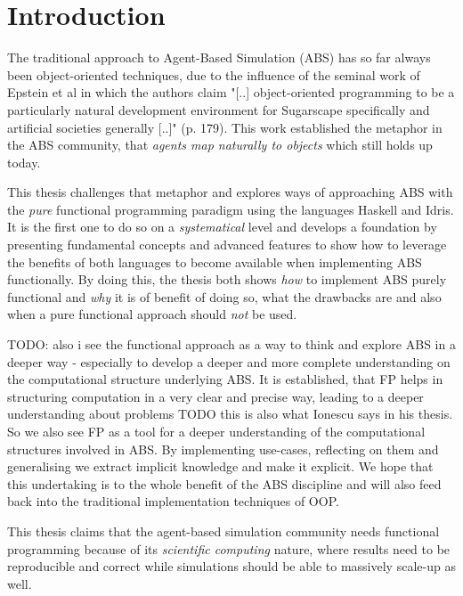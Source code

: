 \chapter{Introduction}
\label{ch:intro}

The traditional approach to Agent-Based Simulation (ABS) has so far always been object-oriented techniques, due to the influence of the seminal work of Epstein et al \cite{epstein_growing_1996} in which the authors claim "[..] object-oriented programming to be a particularly natural development environment for Sugarscape specifically and artificial societies generally [..]" (p. 179). This work established the metaphor in the ABS community, that \textit{agents map naturally to objects} \cite{north_managing_2007} which still holds up today.

This thesis challenges that metaphor and explores ways of approaching ABS with the \textit{pure} functional programming paradigm using the languages Haskell and Idris. It is the first one to do so on a \textit{systematical} level and develops a foundation by presenting fundamental concepts and advanced features to show how to leverage the benefits of both languages \cite{hudak_history_2007, brady_idris_2013} to become available when implementing ABS functionally. By doing this, the thesis both shows \textit{how} to implement ABS purely functional and \textit{why} it is of benefit of doing so, what the drawbacks are and also when a pure functional approach should \textit{not} be used. 

TODO: also i see the functional approach as a way to think and explore ABS in a deeper way - especially to develop a deeper and more complete understanding on the computational structure underlying ABS. It is established, that FP helps in structuring computation in a very clear and precise way, leading to a deeper understanding about problems TODO this is also what Ionescu says in his thesis. So we also see FP as a tool for a deeper understanding of the computational structures involved in ABS. By implementing use-cases, reflecting on them and generalising we extract implicit knowledge and make it explicit. We hope that this undertaking is to the whole benefit of the ABS discipline and will also feed back into the traditional implementation techniques of OOP.

This thesis claims that the agent-based simulation community needs functional programming because of its \textit{scientific computing} nature, where results need to be reproducible and correct while simulations should be able to massively scale-up as well. %

